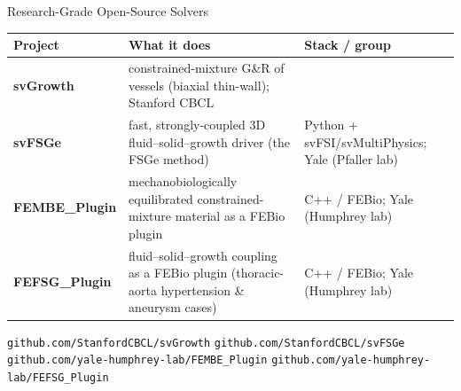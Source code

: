 \begin{frame}[t]{Research-Grade Open-Source Solvers}
  \small
  \begin{center}
  \renewcommand{\arraystretch}{1.4}
  \begin{tabular}{@{}p{}p{}p{}@{}}
    \toprule
    \textbf{Project} & \textbf{What it does} & \textbf{Stack / group} \\
    \midrule
    \textbf{\color{YaleBlue}svGrowth} & constrained-mixture G\&R of vessels
      (biaxial thin-wall); Stanford CBCL \\
    \textbf{\color{YaleBlue}svFSGe} & fast, strongly-coupled 3D
      fluid--solid--growth driver (the FSGe method) &
      Python + svFSI/svMultiPhysics; Yale (Pfaller lab) \\
    \textbf{\color{YaleBlue}FEMBE\_Plugin} & mechanobiologically equilibrated
      constrained-mixture material as a FEBio plugin &
      C++ / FEBio; Yale (Humphrey lab) \\
    \textbf{\color{YaleBlue}FEFSG\_Plugin} & fluid--solid--growth coupling as a
      FEBio plugin (thoracic-aorta hypertension \& aneurysm cases) &
      C++ / FEBio; Yale (Humphrey lab) \\
    \bottomrule
  \end{tabular}
  \end{center}
  \vspace{0.5em}
  {\footnotesize
  \texttt{github.com/StanfordCBCL/svGrowth} \quad
  \texttt{github.com/StanfordCBCL/svFSGe} \\
  \texttt{github.com/yale-humphrey-lab/FEMBE\_Plugin} \quad
  \texttt{github.com/yale-humphrey-lab/FEFSG\_Plugin}}
\end{frame}

